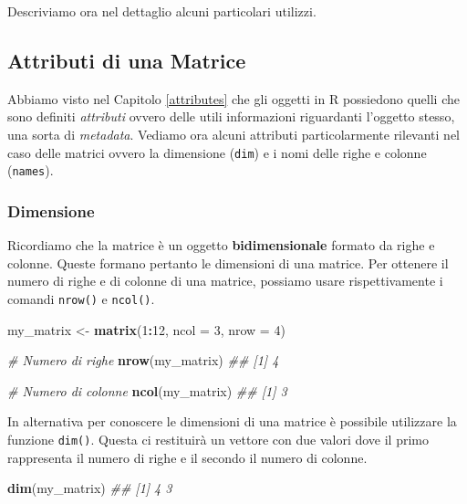 \documentclass[
]{book}
\newenvironment{Shaded}{\begin{snugshade}}{\end{snugshade}}
\newcommand{\CommentTok}[1]{\textcolor[rgb]{0.56,0.35,0.01}{\textit{#1}}}
\newcommand{\DataTypeTok}[1]{\textcolor[rgb]{0.13,0.29,0.53}{#1}}
\newcommand{\DecValTok}[1]{\textcolor[rgb]{0.00,0.00,0.81}{#1}}
\newcommand{\KeywordTok}[1]{\textcolor[rgb]{0.13,0.29,0.53}{\textbf{#1}}}
\newcommand{\NormalTok}[1]{#1}
\newcommand{\OperatorTok}[1]{\textcolor[rgb]{0.81,0.36,0.00}{\textbf{#1}}}
\newcommand{\StringTok}[1]{\textcolor[rgb]{0.31,0.60,0.02}{#1}}
\begin{document}
Descriviamo ora nel dettaglio alcuni particolari utilizzi.

\hypertarget{mat-prop}{%
\subsection{Attributi di una Matrice}\label{mat-prop}}

Abbiamo visto nel Capitolo \ref{attributes} che gli oggetti in R possiedono quelli che sono definiti \emph{attributi} ovvero delle utili informazioni riguardanti l'oggetto stesso, una sorta di \emph{metadata}. Vediamo ora alcuni attributi particolarmente rilevanti nel caso delle matrici ovvero la dimensione (\texttt{dim}) e i nomi delle righe e colonne (\texttt{names}).

\hypertarget{dimensione-1}{%
\subsubsection*{Dimensione}\label{dimensione-1}}

Ricordiamo che la matrice è un oggetto \textbf{bidimensionale} formato da righe e colonne. Queste formano pertanto le dimensioni di una matrice. Per ottenere il numero di righe e di colonne di una matrice, possiamo usare rispettivamente i comandi \texttt{nrow()} e \texttt{ncol()}.

\begin{Shaded}
\begin{Highlighting}[]
\NormalTok{my_matrix <-}\StringTok{ }\KeywordTok{matrix}\NormalTok{(}\DecValTok{1}\OperatorTok{:}\DecValTok{12}\NormalTok{, }\DataTypeTok{ncol =} \DecValTok{3}\NormalTok{, }\DataTypeTok{nrow =} \DecValTok{4}\NormalTok{)}

\CommentTok{# Numero di righe}
\KeywordTok{nrow}\NormalTok{(my_matrix)}
\CommentTok{## [1] 4}

\CommentTok{# Numero di colonne}
\KeywordTok{ncol}\NormalTok{(my_matrix)}
\CommentTok{## [1] 3}
\end{Highlighting}
\end{Shaded}

In alternativa per conoscere le dimensioni di una matrice è possibile utilizzare la funzione \texttt{dim()}. Questa ci restituirà un vettore con due valori dove il primo rappresenta il numero di righe e il secondo il numero di colonne.

\begin{Shaded}
\begin{Highlighting}[]
\KeywordTok{dim}\NormalTok{(my_matrix)}
\CommentTok{## [1] 4 3}
\end{Highlighting}
\end{Shaded}
\end{document}
